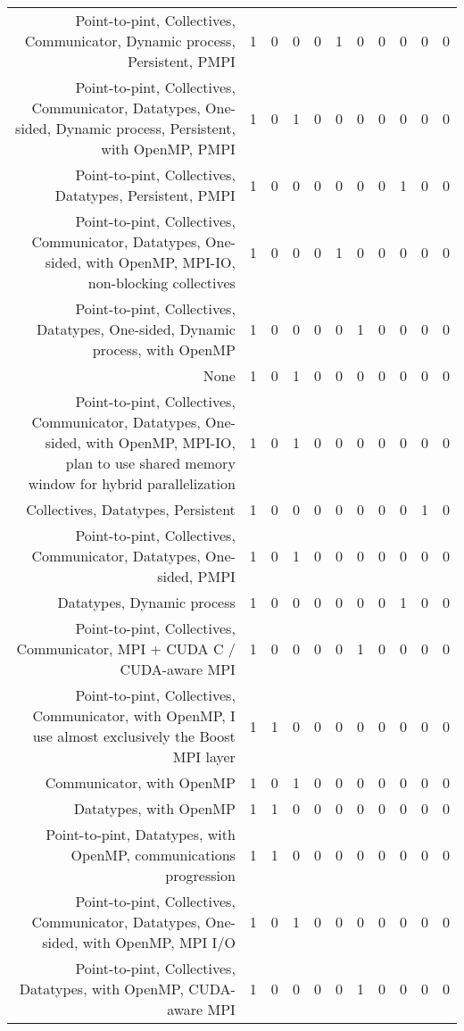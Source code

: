 {\begin{landscape}
\begin{longtable}[htb]{r|c|c|c|c|c|c|c|c|c|c}
{Point-to-pint, Collectives, Communicator, Dynamic process, Persistent, PMPI} & 1 & 0 & 0 & 0 & 1 & 0 & 0 & 0 & 0 & 0 \\%
{Point-to-pint, Collectives, Communicator, Datatypes, One-sided, Dynamic process, Persistent, with OpenMP, PMPI} & 1 & 0 & 1 & 0 & 0 & 0 & 0 & 0 & 0 & 0 \\%
{Point-to-pint, Collectives, Datatypes, Persistent, PMPI} & 1 & 0 & 0 & 0 & 0 & 0 & 0 & 1 & 0 & 0 \\%
{Point-to-pint, Collectives, Communicator, Datatypes, One-sided, with OpenMP, MPI-IO, non-blocking collectives} & 1 & 0 & 0 & 0 & 1 & 0 & 0 & 0 & 0 & 0 \\%
{Point-to-pint, Collectives, Datatypes, One-sided, Dynamic process, with OpenMP} & 1 & 0 & 0 & 0 & 0 & 1 & 0 & 0 & 0 & 0 \\%
{None} & 1 & 0 & 1 & 0 & 0 & 0 & 0 & 0 & 0 & 0 \\%
{Point-to-pint, Collectives, Communicator, Datatypes, One-sided, with OpenMP, MPI-IO, plan to use shared memory window for hybrid parallelization} & 1 & 0 & 1 & 0 & 0 & 0 & 0 & 0 & 0 & 0 \\%
{Collectives, Datatypes, Persistent} & 1 & 0 & 0 & 0 & 0 & 0 & 0 & 0 & 1 & 0 \\%
{Point-to-pint, Collectives, Communicator, Datatypes, One-sided, PMPI} & 1 & 0 & 1 & 0 & 0 & 0 & 0 & 0 & 0 & 0 \\%
{Datatypes, Dynamic process} & 1 & 0 & 0 & 0 & 0 & 0 & 0 & 1 & 0 & 0 \\%
{Point-to-pint, Collectives, Communicator, MPI + CUDA C / CUDA-aware MPI} & 1 & 0 & 0 & 0 & 0 & 1 & 0 & 0 & 0 & 0 \\%
{Point-to-pint, Collectives, Communicator, with OpenMP, I use almost exclusively the Boost MPI layer} & 1 & 1 & 0 & 0 & 0 & 0 & 0 & 0 & 0 & 0 \\%
{Communicator, with OpenMP} & 1 & 0 & 1 & 0 & 0 & 0 & 0 & 0 & 0 & 0 \\%
{Datatypes, with OpenMP} & 1 & 1 & 0 & 0 & 0 & 0 & 0 & 0 & 0 & 0 \\%
{Point-to-pint, Datatypes, with OpenMP, communications progression} & 1 & 1 & 0 & 0 & 0 & 0 & 0 & 0 & 0 & 0 \\%
{Point-to-pint, Collectives, Communicator, Datatypes, One-sided, with OpenMP, MPI I/O} & 1 & 0 & 1 & 0 & 0 & 0 & 0 & 0 & 0 & 0 \\%
{Point-to-pint, Collectives, Datatypes, with OpenMP, CUDA-aware MPI} & 1 & 0 & 0 & 0 & 0 & 1 & 0 & 0 & 0 & 0 \\%

\end{longtable}
\end{landscape}}
